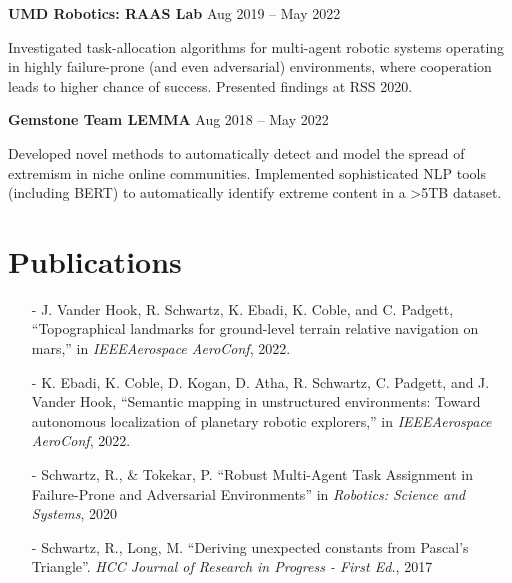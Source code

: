 \documentclass[letterpaper,11pt]{article}
\begin{document}
\begin{minipage}[t]{0.42\textwidth}
  \noindent
  \textbf{UMD Robotics: RAAS Lab} \hspace{\fill} Aug 2019 -- May 2022

  \setlength{\parindent}{15pt}
  {\small Investigated task-allocation algorithms for multi-agent robotic systems operating in highly failure-prone (and even adversarial) environments, where cooperation leads to higher chance of success. Presented findings at RSS 2020.}

  \vspace*{6pt}

  \noindent
  \textbf{Gemstone Team LEMMA} \hspace{\fill} Aug 2018 -- May 2022
    
  \setlength{\parindent}{15pt}
  {\small Developed novel methods to automatically detect and model the spread of extremism in niche online communities. Implemented sophisticated NLP tools (including BERT) to automatically identify extreme content in a >5TB dataset. }
\end{minipage}


\section{Publications}
\small{
  \begin{itemize}
      \item[-] J. Vander Hook, R. Schwartz, K. Ebadi, K. Coble, and C. Padgett, ``Topographical landmarks for ground-level terrain relative navigation on mars,'' in \textit{IEEEAerospace AeroConf}, 2022.

      \item[-] K. Ebadi, K. Coble, D. Kogan, D. Atha, R. Schwartz, C. Padgett, and J. Vander Hook, ``Semantic  mapping in unstructured environments:  Toward autonomous localization of planetary robotic explorers,'' in \textit{IEEEAerospace AeroConf}, 2022.

      \item[-] Schwartz, R., \& Tokekar, P. ``Robust Multi-Agent Task Assignment in Failure-Prone and Adversarial Environments'' in \textit{Robotics: Science and Systems}, 2020

      \item[-] Schwartz, R., Long, M. ``Deriving unexpected constants from Pascal's Triangle''. \textit{HCC Journal of Research in Progress - First Ed.}, 2017
  \end{itemize} 
}
\end{document}
